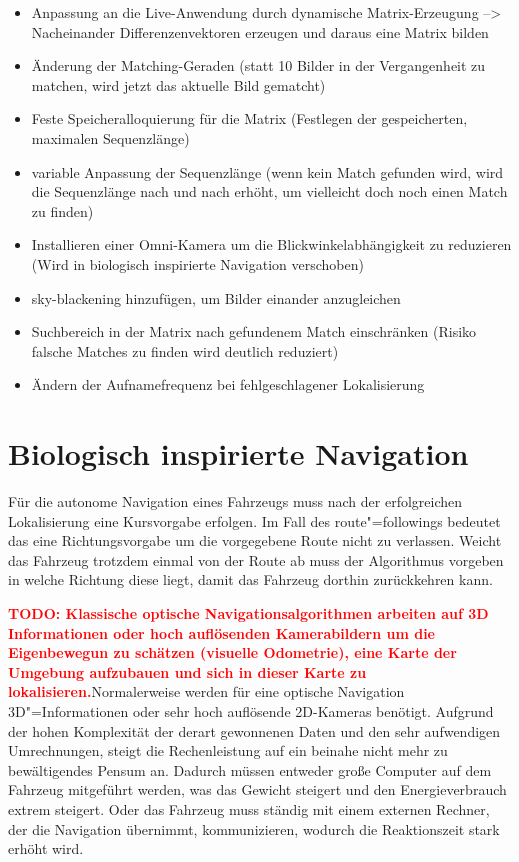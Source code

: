 \documentclass[12pt,a4paper,titlepage]{scrartcl}
\newcommand{\cmark}{\Large{\color{OliveGreen}\ding{51}}\normalsize}
\newcommand{\xmark}{\Large{\color{red}\ding{55}}\normalsize}
\newcommand{\todo}[1]{\textcolor{red}{\textbf{TODO: #1}}}
\begin{document}
\begin{itemize}
\item Anpassung an die Live-Anwendung durch dynamische Matrix-Erzeugung --> Nacheinander Differenzenvektoren erzeugen und daraus eine Matrix bilden  \cmark
\item Änderung der Matching-Geraden (statt 10 Bilder in der Vergangenheit zu matchen, wird jetzt das aktuelle Bild gematcht)   \cmark
\item Feste Speicheralloquierung für die Matrix (Festlegen der gespeicherten, maximalen Sequenzlänge)   \cmark
\item variable Anpassung der Sequenzlänge (wenn kein Match gefunden wird, wird die Sequenzlänge nach und nach erhöht, um vielleicht doch noch einen Match zu finden)   \cmark
\item Installieren einer Omni-Kamera um die Blickwinkelabhängigkeit zu reduzieren (Wird in biologisch inspirierte Navigation verschoben) \xmark
\item sky-blackening hinzufügen, um Bilder einander anzugleichen   \cmark
\item Suchbereich in der Matrix nach gefundenem Match einschränken (Risiko falsche Matches zu finden wird deutlich reduziert)   \cmark
\item Ändern der Aufnamefrequenz bei fehlgeschlagener Lokalisierung \xmark
\end{itemize}
\pagebreak
\section{Biologisch inspirierte Navigation}
Für die autonome Navigation eines Fahrzeugs muss nach der erfolgreichen Lokalisierung eine Kursvorgabe erfolgen. Im Fall des route"=followings bedeutet das eine Richtungsvorgabe um die vorgegebene Route nicht zu verlassen. Weicht das Fahrzeug trotzdem einmal von der Route ab muss der Algorithmus vorgeben in welche Richtung diese liegt, damit das Fahrzeug dorthin zurückkehren kann. 

\todo{Klassische optische Navigationsalgorithmen arbeiten auf 3D Informationen oder hoch auflösenden Kamerabildern um die Eigenbewegun zu schätzen (visuelle Odometrie), eine Karte der Umgebung aufzubauen und sich in dieser Karte zu lokalisieren.}Normalerweise werden für eine optische Navigation 3D"=Informationen oder sehr hoch auflösende 2D-Kameras benötigt. Aufgrund der hohen Komplexität der derart gewonnenen Daten und den sehr aufwendigen Umrechnungen, steigt die Rechenleistung auf ein beinahe nicht mehr zu bewältigendes Pensum an. Dadurch müssen entweder große Computer auf dem Fahrzeug mitgeführt werden, was das Gewicht steigert und den Energieverbrauch extrem steigert. Oder das Fahrzeug muss ständig mit einem externen Rechner, der die Navigation übernimmt, kommunizieren, wodurch die Reaktionszeit stark erhöht wird. 
\end{document}
